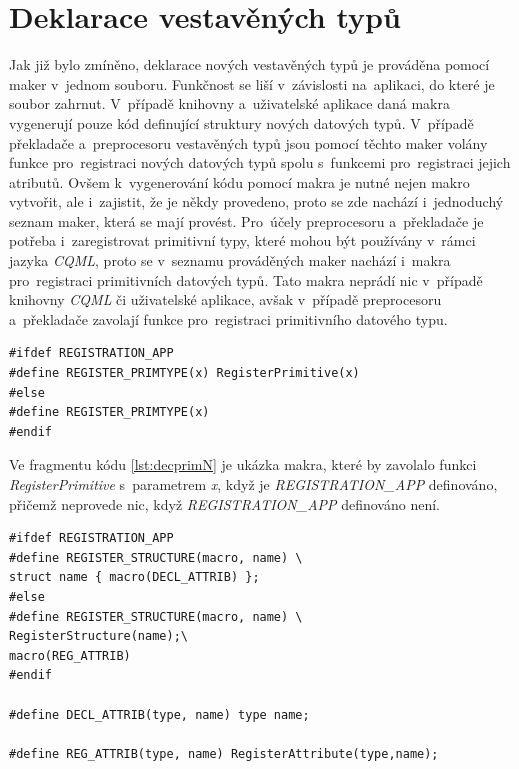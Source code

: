 \documentclass[11pt,twoside,a4paper]{book}
\begin{document}
\section{\label{SEC:macN}Deklarace vestavěných typů}
Jak již bylo zmíněno, deklarace nových vestavěných typů je prováděna pomocí maker v~jednom souboru. Funkčnost se liší v~závislosti na~aplikaci, do které je soubor zahrnut. V~případě knihovny a~uživatelské aplikace daná makra vygenerují pouze kód definující struktury nových datových typů. V~případě překladače a~preprocesoru vestavěných typů jsou pomocí těchto maker volány funkce pro~registraci nových datových typů spolu s~funkcemi pro~registraci jejich atributů. Ovšem k~vygenerování kódu pomocí makra je nutné nejen makro vytvořit, ale i~zajistit, že je někdy provedeno, proto se zde nachází i~jednoduchý seznam maker, která se mají provést. Pro~účely preprocesoru a~překladače je potřeba i~zaregistrovat primitivní typy, které mohou být používány v~rámci jazyka \textit{CQML}, proto se v~seznamu prováděných maker nachází i~makra pro~registraci primitivních datových typů. Tato makra neprádí nic v~případě knihovny \textit{CQML} či uživatelské aplikace, avšak v~případě preprocesoru a~překladače zavolají funkce pro~registraci primitivního datového typu.

\begin{lstlisting}[float,frame=single,caption={Makro registrující datový typ v~případě, že je definováno jiné makro.},label=lst:decprimN]
#ifdef REGISTRATION_APP
#define REGISTER_PRIMTYPE(x) RegisterPrimitive(x)
#else
#define REGISTER_PRIMTYPE(x)
#endif
\end{lstlisting}
Ve fragmentu kódu \ref{lst:decprimN} je ukázka makra, které by zavolalo funkci \textit{RegisterPrimitive} s~parametrem \textit{x}, když je \textit{REGISTRATION\_APP} definováno, přičemž neprovede nic, když \textit{REGISTRATION\_APP} definováno není.


\begin{lstlisting}[frame=single,caption=Makro\, které registruje strukturu nebo vypíše její deklaraci\, v~závislosti na~jiném makru. ,label=lst:decN]
#ifdef REGISTRATION_APP
#define REGISTER_STRUCTURE(macro, name) \
struct name { macro(DECL_ATTRIB) };
#else
#define REGISTER_STRUCTURE(macro, name) \
RegisterStructure(name);\
macro(REG_ATTRIB) 
#endif

#define DECL_ATTRIB(type, name) type name;

#define REG_ATTRIB(type, name) RegisterAttribute(type,name);
\end{lstlisting}
  
\end{document}
